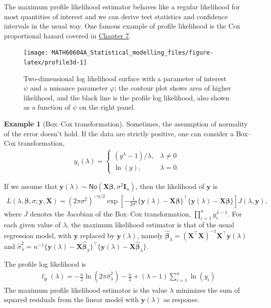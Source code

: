 \documentclass[
  11pt,
  letterpaper,
]{book}
\theoremstyle{definition}
\theoremstyle{definition}
\newtheorem{example}{Example}[chapter]
\theoremstyle{definition}
\theoremstyle{definition}
\theoremstyle{remark}
\begin{document}
The maximum profile likelihood estimator behaves like a regular likelihood for most quantities of interest and we can derive test statistics and confidence intervals in the usual way. One famous example of profile likelihood is the Cox proportional hazard covered in \protect\hyperlink{survival}{Chapter 7}.

\begin{figure}

{\centering \texttt{[image: MATH60604A\_Statistical\_modelling\_files/figure-latex/profile3d-1]} 

}

\caption{Two-dimensional log likelihood surface with a parameter of interest $\psi$ and a nuisance parameter $\varphi$; the contour plot shows area of higher likelihood, and the black line is the profile log likelihood, also shown as a function of $\psi$ on the right panel.}\label{fig:profile3d}
\end{figure}

\begin{example}[Box--Cox transformation]
\protect\hypertarget{exm:boxcox}{}\label{exm:boxcox}Sometimes, the assumption of normality of the error doesn't hold. If the data are strictly positive, one can consider a Box--Cox transformation,
\begin{align*}
y_i(\lambda)= \begin{cases}
(y^{\lambda}-1)/\lambda, & \lambda \neq 0\\
\ln(y), & \lambda=0.
\end{cases}
\end{align*}

If we assume that \(\boldsymbol{y}(\lambda) \sim \mathsf{No}(\mathbf{X}\boldsymbol{\beta}, \sigma^2 \mathbf{I}_n)\), then the likelihood of \(\boldsymbol{y}\) is
\begin{align*}
L(\lambda, \boldsymbol{\beta}, \sigma; \boldsymbol{y}, \mathbf{X}) = (2\pi\sigma^2)^{-n/2}\exp \left[ - \frac{1}{2\sigma^2}\{\boldsymbol{y}(\lambda) - \mathbf{X}\boldsymbol{\beta}\}^\top\{\boldsymbol{y}(\lambda) - \mathbf{X}\boldsymbol{\beta}\}\right] J(\lambda, \boldsymbol{y}),
\end{align*}
where \(J\) denotes the Jacobian of the Box--Cox transformation, \(\prod_{i=1}^n y_i^{\lambda-1}\).
For each given value of \(\lambda\), the maximum likelihood estimator is that of the usual regression model, with \(\boldsymbol{y}\) replaced by \(\boldsymbol{y}(\lambda)\), namely \(\widehat{\boldsymbol{\beta}}_\lambda = (\mathbf{X}^\top\mathbf{X})^{-1}\mathbf{X}^\top \boldsymbol{y}(\lambda)\) and \(\widehat{\sigma}^2_\lambda = n^{-1}\{ \boldsymbol{y}(\lambda) - \mathbf{X}\widehat{\boldsymbol{\beta}}_\lambda\}^\top\{ \boldsymbol{y}(\lambda) - \mathbf{X}\widehat{\boldsymbol{\beta}}_\lambda\}\).

The profile log likelihood is
\begin{align*}
\ell_{\mathsf{p}}(\lambda) = -\frac{n}{2}\ln(2\pi \widehat{\sigma}^2_\lambda) - \frac{n}{2} + (\lambda - 1)\sum_{i=1}^n \ln(y_i)
\end{align*}
The maximum profile likelihood estimator is the value \(\lambda\) minimizes the sum of squared residuals from the linear model with \(\boldsymbol{y}(\lambda)\) as response.
\end{example}
\end{document}
